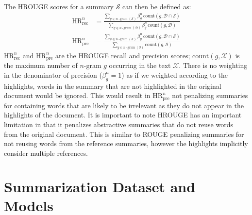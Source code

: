 \documentclass[11pt,a4paper]{article}
\newcommand\hrouge{\textsc{HROUGE}}
\newcommand\rouge{\textsc{ROUGE}}
\begin{document}
The HROUGE scores for a summary $\mathcal{S}$ can then be defined as:
\begin{align}
    \text{HR}_{\mathrm{rec}}^n &= \frac{\displaystyle\sum_{g \in n\operatorname{-gram}(\mathcal{S})} \beta_g^n\, \text{count}(g, \mathcal{D} \cap \mathcal{S})}{\displaystyle\sum_{g \in n\operatorname{-gram}(\mathcal{D})} \beta_g^n\,\text{count}(g, \mathcal{D})} \\
    \text{HR}_{\mathrm{pre}}^n &= \frac{\displaystyle\sum_{g \in n\operatorname{-gram}(\mathcal{S})} \beta_g^n\, \text{count}(g, \mathcal{D} \cap \mathcal{S})}{\displaystyle\sum_{g \in n\operatorname{-gram}(\mathcal{S})} \text{count}(g, \mathcal{S})}
\end{align}
\noindent $\text{HR}_{\mathrm{rec}}^n$ and $\text{HR}_{\mathrm{pre}}^n$ are the HROUGE recall and precision scores; $\text{count}(g, \mathcal{X})$ is the maximum number of $n$-gram $g$ occurring in the text $\mathcal{X}$. There is no weighting in the denominator of precision ($\beta_g^n = 1$) as if we weighted according to the highlights, words in the summary that are not highlighted in the original document would be ignored. This would result in $\text{HR}_{\mathrm{pre}}^n$ not penalizing summaries for containing words that are likely to be irrelevant as they do not appear in the highlights of the document.
It is important to note \hrouge{} has an important limitation in that it penalizes abstractive summaries that do not reuse words from the original document. This is similar to \rouge{} penalizing summaries for not reusing words from the reference summaries, however the highlights implicitly consider multiple references.  %

\section{Summarization Dataset and Models}
\label{sec:data-models}
\end{document}
